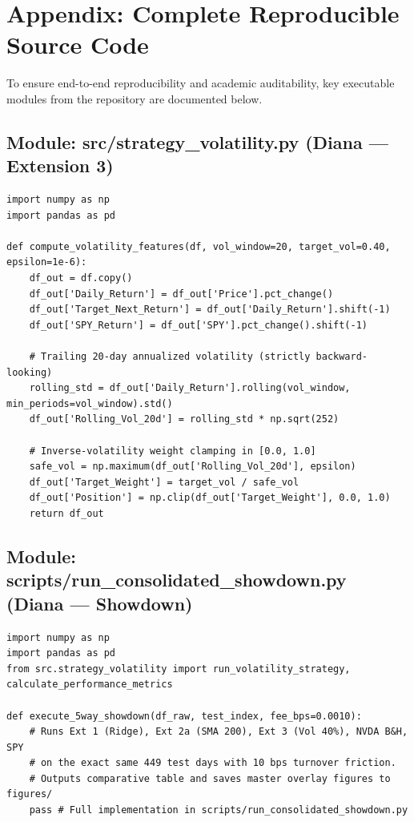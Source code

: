 \documentclass[12pt, a4paper]{article}
\begin{document}
\section{Appendix: Complete Reproducible Source Code}
{\small
To ensure end-to-end reproducibility and academic auditability, key executable modules from the repository are documented below.

\subsection*{Module: src/strategy\_volatility.py (Diana --- Extension 3)}
\begin{verbatim}
import numpy as np
import pandas as pd

def compute_volatility_features(df, vol_window=20, target_vol=0.40, epsilon=1e-6):
    df_out = df.copy()
    df_out['Daily_Return'] = df_out['Price'].pct_change()
    df_out['Target_Next_Return'] = df_out['Daily_Return'].shift(-1)
    df_out['SPY_Return'] = df_out['SPY'].pct_change().shift(-1)
    
    # Trailing 20-day annualized volatility (strictly backward-looking)
    rolling_std = df_out['Daily_Return'].rolling(vol_window, min_periods=vol_window).std()
    df_out['Rolling_Vol_20d'] = rolling_std * np.sqrt(252)
    
    # Inverse-volatility weight clamping in [0.0, 1.0]
    safe_vol = np.maximum(df_out['Rolling_Vol_20d'], epsilon)
    df_out['Target_Weight'] = target_vol / safe_vol
    df_out['Position'] = np.clip(df_out['Target_Weight'], 0.0, 1.0)
    return df_out
\end{verbatim}

\subsection*{Module: scripts/run\_consolidated\_showdown.py (Diana --- Showdown)}
\begin{verbatim}
import numpy as np
import pandas as pd
from src.strategy_volatility import run_volatility_strategy, calculate_performance_metrics

def execute_5way_showdown(df_raw, test_index, fee_bps=0.0010):
    # Runs Ext 1 (Ridge), Ext 2a (SMA 200), Ext 3 (Vol 40%), NVDA B&H, SPY
    # on the exact same 449 test days with 10 bps turnover friction.
    # Outputs comparative table and saves master overlay figures to figures/
    pass # Full implementation in scripts/run_consolidated_showdown.py
\end{verbatim}
}
\end{document}
